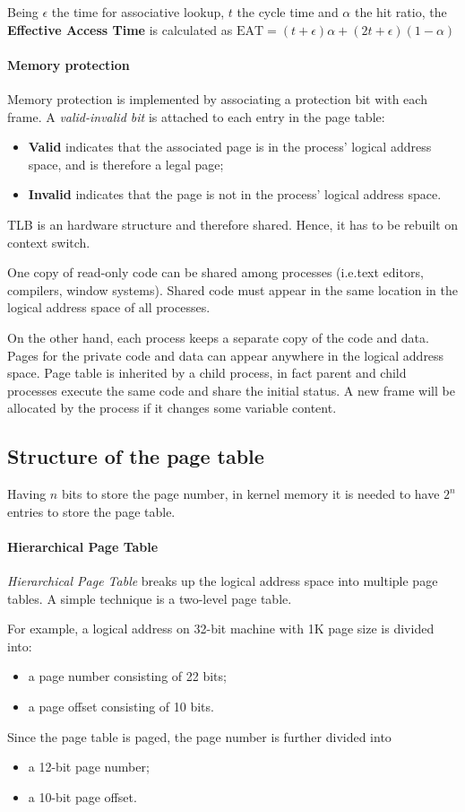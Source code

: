 Being $\epsilon$ the time for associative lookup, $t$  the cycle time and $\alpha$ the hit ratio, the \textbf{Effective Access Time} is calculated as $\text{EAT} = (t + \epsilon) \alpha + (2 t + \epsilon)(1 - \alpha)$

\paragraph{Memory protection} Memory protection is implemented by associating a protection bit with each frame. A \emph{valid-invalid bit} is attached to each entry in the page table:

\begin{itemize}
\item \textbf{Valid} indicates that the associated page is in the process' logical address space, and is therefore a legal page;
\item \textbf{Invalid} indicates that the page is not in the process' logical address space.
\end{itemize}
TLB is an hardware structure and therefore shared. Hence, it has to be rebuilt on context switch.

One copy of read-only code can be shared among processes (i.e.\@ text editors, compilers, window systems). Shared code must appear in the same location in the logical address space of all processes.

On the other hand, each process keeps a separate copy of the code and data. Pages for the private code and data can appear anywhere in the logical address space. Page table is inherited by a child process, in fact parent and child processes execute the same code and share the initial status. A new frame will be allocated by the process if it changes some variable content.

\subsection{Structure of the page table}
Having $n$ bits to store the page number, in kernel memory it is needed to have $2^n$ entries to store the page table.
\paragraph{Hierarchical Page Table} \emph{Hierarchical Page Table} breaks up the logical address space into multiple page tables. A simple technique is a two-level page table.

For example, a logical address on 32-bit machine with 1K page size is divided into:
\begin{itemize}
\item a page number consisting of 22 bits;
\item a page offset consisting of 10 bits.
\end{itemize}
Since the page table is paged, the page number is further divided into
\begin{itemize}
\item a 12-bit page number;
\item a 10-bit page offset.
\end{itemize}

